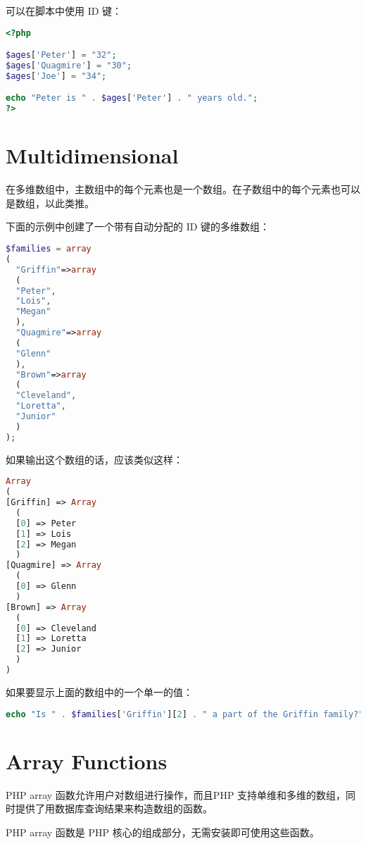 可以在脚本中使用 ID 键：

\begin{lstlisting}[language=PHP]
<?php

$ages['Peter'] = "32";
$ages['Quagmire'] = "30";
$ages['Joe'] = "34";

echo "Peter is " . $ages['Peter'] . " years old.";
?>
\end{lstlisting}

\section{Multidimensional}



在多维数组中，主数组中的每个元素也是一个数组。在子数组中的每个元素也可以是数组，以此类推。


下面的示例中创建了一个带有自动分配的 ID 键的多维数组：


\begin{lstlisting}[language=PHP]
$families = array
(
  "Griffin"=>array
  (
  "Peter",
  "Lois",
  "Megan"
  ),
  "Quagmire"=>array
  (
  "Glenn"
  ),
  "Brown"=>array
  (
  "Cleveland",
  "Loretta",
  "Junior"
  )
);
\end{lstlisting}

如果输出这个数组的话，应该类似这样：


\begin{lstlisting}[language=PHP]
Array
(
[Griffin] => Array
  (
  [0] => Peter
  [1] => Lois
  [2] => Megan
  )
[Quagmire] => Array
  (
  [0] => Glenn
  )
[Brown] => Array
  (
  [0] => Cleveland
  [1] => Loretta
  [2] => Junior
  )
)
\end{lstlisting}

如果要显示上面的数组中的一个单一的值：


\begin{lstlisting}[language=PHP]
echo "Is " . $families['Griffin'][2] . " a part of the Griffin family?"; 
\end{lstlisting}





\section{Array Functions}


PHP array 函数允许用户对数组进行操作，而且PHP 支持单维和多维的数组，同时提供了用数据库查询结果来构造数组的函数。

PHP array 函数是 PHP 核心的组成部分，无需安装即可使用这些函数。



